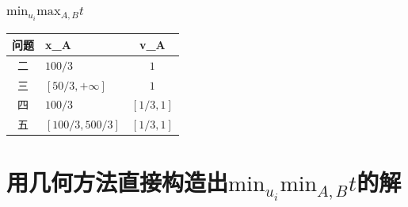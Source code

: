 \documentclass[withoutpreface,bwprint]{cumcmthesis}
\begin{document}
\subsubsection{$\text{min}_{u_i}\text{max}_{A,B}t$}
\begin{table}[H]
\centering
\begin{tabularx}{\textwidth}{CLC}
\toprule
问题    & x_A    & v_A \\
\midrule
二& $100/3$ & $1$ \\
三& $[50/3,+\infty]$ & $1$ \\
四& $100/3$ & $[1/3,1]$ \\
五& $[100/3,500/3]$ & $[1/3,1]$ \\
\bottomrule
\end{tabularx}
\label{tab:符号说明}
\end{table}








\section{用几何方法直接构造出$\text{min}_{u_i}\text{min}_{A,B}t$的解}
\end{document}
